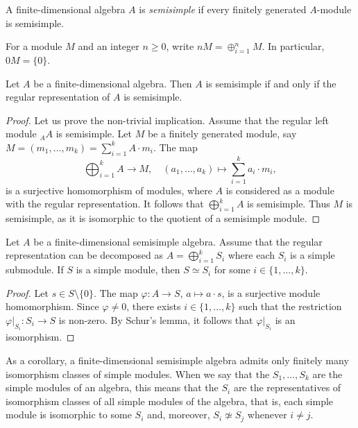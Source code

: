 \begin{definition}
    A finite-dimensional algebra $A$ is \emph{semisimple} if every finitely
    generated $A$-module is semisimple. 
\end{definition}

For a module $M$ and an integer $n\geq0$, write $nM=\oplus_{i=1}^nM$. 
In particular, $0M=\{0\}$.

\begin{proposition}
  \label{pro:regular_semisimple}
  Let $A$ be a finite-dimensional algebra. Then $A$ is semisimple if and only if
  the regular representation of $A$ is semisimple. 
\end{proposition}

\begin{proof}
Let us prove the non-trivial implication. 
Assume that the regular left module ${}_AA$ is semisimple.
Let $M$ be a finitely generated
module, say $M=(m_1,\dots,m_k)=\sum_{i=1}^k A\cdot m_i$.  The map
\[
\bigoplus_{i=1}^k A\to M,\quad
(a_1,\dots,a_k)\mapsto \sum_{i=1}^k a_i\cdot m_i,
\]
is a surjective homomorphism of modules, where $A$ is considered as a module
with the regular representation. It follows that
$\bigoplus_{i=1}^kA$ is semisimple.  Thus $M$ is semisimple, as it is
isomorphic to the quotient of a semisimple module.
\end{proof}

\begin{theorem}
Let $A$ be a finite-dimensional semisimple algebra. 
Assume that the regular representation can be decomposed as $A=\bigoplus_{i=1}^k S_i$ where each $S_i$ is a simple submodule.  
If $S$ is a simple module, then $S\simeq S_i$ for some $i\in\{1,\dots,k\}$. 
\end{theorem}

\begin{proof}
Let $s\in S\setminus\{0\}$. The map $\varphi\colon A\to S$, $a\mapsto a\cdot s$, is a surjective module homomorphism. Since 
$\varphi\ne 0$, there exists $i\in\{1,\dots,k\}$ such that the restriction 
$\varphi|_{S_i}\colon S_i\to S$ is non-zero. By Schur's lemma, it follows that  
$\varphi|_{S_i}$ is an isomorphism.   	
\end{proof}

As a corollary, a finite-dimensional semisimple algebra admits 
only finitely many isomorphism classes of simple modules. When we say that 
the $S_1,\dots,S_k$ are the simple modules of an algebra, this means that the $S_i$ are the representatives
of isomorphism classes of all simple modules of the algebra, that is, each simple module is isomorphic to
some $S_i$ and, moreover,  
$S_i\not\simeq S_j$ whenever $i\ne j$. 

